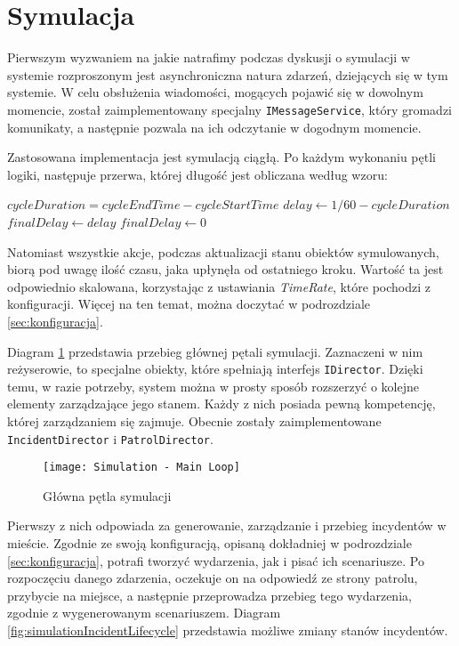 \section{Symulacja}
\label{sec:symulacja}

\par Pierwszym wyzwaniem na jakie natrafimy podczas dyskusji o symulacji w systemie rozproszonym jest asynchroniczna natura zdarzeń, dziejących się w tym systemie. W celu obsłużenia wiadomości, mogących pojawić się w dowolnym momencie, został zaimplementowany specjalny \texttt{IMessageService}, który gromadzi komunikaty, a następnie pozwala na ich odczytanie w dogodnym momencie.

\par Zastosowana implementacja jest symulacją ciągłą. Po każdym wykonaniu pętli logiki, następuje przerwa, której długość jest obliczana według wzoru:

\begin{algorithmic}
\State $cycleDuration = cycleEndTime - cycleStartTime$
\State $delay \gets 1 / 60 - cycleDuration$
    \State $finalDelay \gets delay$
\Else 
    \State $finalDelay \gets 0$ 
\EndIf
\end{algorithmic}

Natomiast wszystkie akcje, podczas aktualizacji stanu obiektów symulowanych, biorą pod uwagę ilość czasu, jaka upłynęła od ostatniego kroku. Wartość ta jest odpowiednio skalowana, korzystając z ustawiania \emph{TimeRate}, które pochodzi z konfiguracji. Więcej na ten temat, można doczytać w podrozdziale \ref{sec:konfiguracja}.

\par Diagram \ref{fig:simulationMainLoop} przedstawia przebieg głównej pętali symulacji. Zaznaczeni w nim reżyserowie, to specjalne obiekty, które spełniają interfejs \texttt{IDirector}. Dzięki temu, w razie potrzeby, system można w prosty sposób rozszerzyć o kolejne elementy zarządzające jego stanem. Każdy z nich posiada pewną kompetencję, której zarządzaniem się zajmuje. Obecnie zostały zaimplementowane \texttt{IncidentDirector} i \texttt{PatrolDirector}.

\begin{figure}
    \centering
    \texttt{[image: Simulation - Main Loop]}
    \caption{Główna pętla symulacji}
    \label{fig:simulationMainLoop}
\end{figure}

\par Pierwszy z nich odpowiada za generowanie, zarządzanie i przebieg incydentów w mieście. Zgodnie ze swoją konfiguracją, opisaną dokładniej w podrozdziale \ref{sec:konfiguracja}, potrafi tworzyć wydarzenia, jak i pisać ich scenariusze. Po rozpoczęciu danego zdarzenia, oczekuje on na odpowiedź ze strony patrolu, przybycie na miejsce, a następnie przeprowadza przebieg tego wydarzenia, zgodnie z wygenerowanym scenariuszem. Diagram \ref{fig:simulationIncidentLifecycle} przedstawia możliwe zmiany stanów incydentów.

